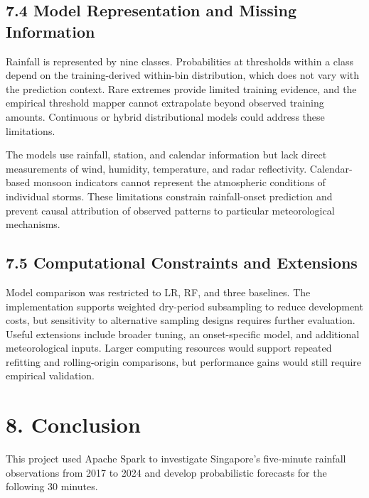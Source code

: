 \documentclass[11pt,a4paper]{article}
\begin{document}
\subsection*{7.4 Model Representation and Missing Information}
{}


Rainfall is represented by nine classes. Probabilities at thresholds within a class depend on the training-derived within-bin distribution, which does not vary with the prediction context. Rare extremes provide limited training evidence, and the empirical threshold mapper cannot extrapolate beyond observed training amounts. Continuous or hybrid distributional models could address these limitations.


The models use rainfall, station, and calendar information but lack direct measurements of wind, humidity, temperature, and radar reflectivity. Calendar-based monsoon indicators cannot represent the atmospheric conditions of individual storms. These limitations constrain rainfall-onset prediction and prevent causal attribution of observed patterns to particular meteorological mechanisms.


\subsection*{7.5 Computational Constraints and Extensions}
{}


Model comparison was restricted to LR, RF, and three baselines. The implementation supports weighted dry-period subsampling to reduce development costs, but sensitivity to alternative sampling designs requires further evaluation. Useful extensions include broader tuning, an onset-specific model, and additional meteorological inputs. Larger computing resources would support repeated refitting and rolling-origin comparisons, but performance gains would still require empirical validation.


\FloatBarrier

\section*{8. Conclusion}
{}


This project used Apache Spark to investigate Singapore’s five-minute rainfall observations from 2017 to 2024 and develop probabilistic forecasts for the following 30 minutes.
\end{document}
